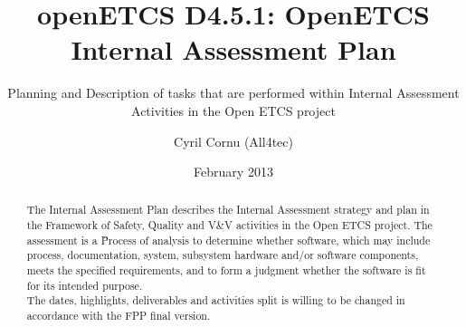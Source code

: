 \documentclass{template/openetcs_report}
\begin{document}
\frontmatter
{}




\title{openETCS D4.5.1: OpenETCS Internal Assessment Plan}

\subtitle{Planning and Description of tasks that are performed within Internal Assessment Activities in the Open ETCS project}

\date{February 2013}

\author{Cyril Cornu (All4tec)}






\begin{abstract}
The Internal Assessment Plan describes the Internal Assessment strategy and plan in the Framework of Safety, Quality and V\&V activities in the Open ETCS project.
The assessment is a \" Process of analysis to determine whether software, which may include process, documentation, system, subsystem hardware and/or software components, meets the specified requirements, and to form a judgment whether the software is fit for its intended purpose.\"
\\
The dates, highlights, deliverables and activities split is willing to be changed in accordance with the FPP final version.
\end{abstract}

\maketitle
\tableofcontents

\end{document}
